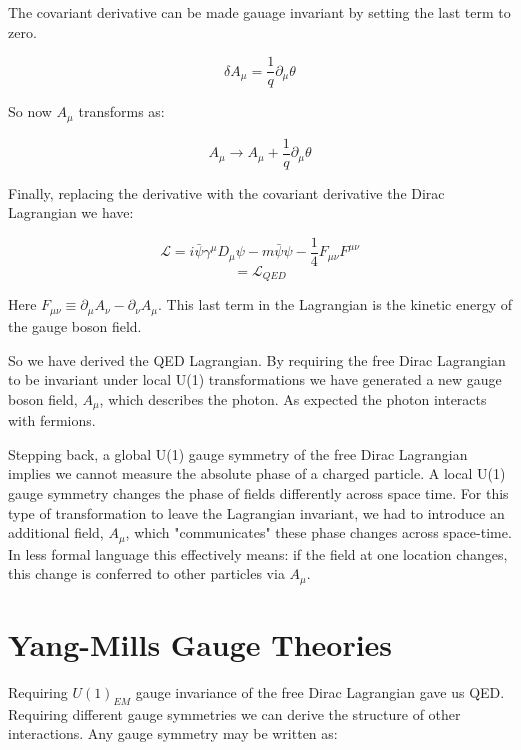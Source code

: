 The covariant derivative can be made gauage invariant by setting the last term to zero.

\begin{equation}
\delta A_{\mu} = \frac{1}{q}\partial_{\mu}\theta
\end{equation}

So now $A_{\mu}$ transforms as:

\begin{equation}
A_{\mu} \rightarrow A_{\mu} + \frac{1}{q}\partial_{\mu}\theta
\end{equation}

Finally, replacing the derivative with the covariant derivative the Dirac Lagrangian we have:

\begin{equation}
\mathcal{L} = i \bar{\psi}\gamma^{\mu}D_{\mu}\psi - m\bar{\psi}\psi - \frac{1}{4}F_{\mu\nu}F^{\mu\nu}
\end{equation}
\begin{equation}
=\mathcal{L}_{QED}
\end{equation}

Here $F_{\mu\nu}\equiv \partial_{\mu}A_{\nu} - \partial_{\nu}A_{\mu}$. This last term in the Lagrangian is the kinetic energy of the gauge boson field.

So we have derived the QED Lagrangian. By requiring the free Dirac Lagrangian to be invariant under local U(1) transformations we have generated a new gauge boson field, $A_{\mu}$, which describes the photon. As expected the photon interacts with fermions.  

Stepping back, a global U(1) gauge symmetry of the free Dirac Lagrangian implies we cannot measure the absolute phase of a charged particle. A local U(1) gauge symmetry changes the phase of fields differently across space time. For this type of transformation to leave the Lagrangian invariant, we had to introduce an additional field, $A_{\mu}$, which "communicates" these phase changes across space-time. In less formal language this effectively means: if the field at one location changes, this change is conferred to other particles via $A_{\mu}$.

\section{Yang-Mills Gauge Theories}
Requiring $U(1)_{EM}$ gauge invariance of the free Dirac Lagrangian gave us QED. Requiring different gauge symmetries we can derive the structure of other interactions. Any gauge symmetry may be written as:

